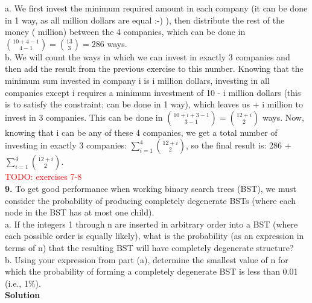 \documentclass[10pt,a4paper,oneside,draft]{report}
\newcommand\myworries[1]{\textcolor{red}{#1}}
\begin{document}
a. We first invest the minimum required amount in each company (it can be done in 1 way, as all million dollars are equal :-) ), then distribute the rest of the money ( million) between the 4 companies, which can be done in ${10 + 4 - 1 \choose 4 - 1} = {13 \choose 3 } = 286 $ ways. \\

b. We will count the ways in which we can invest in exactly 3 companies and then add the result from the previous exercise to this number. Knowing that the minimum sum invested in company i is \textdollar i million dollars, investing in all companies except i requires a minimum investment of 10 - i million dollars (this is to satisfy the constraint; can be done in 1 way), which leaves us  + i million to invest in 3 companies. This can be done in ${10 + i + 3 - 1 \choose 3 - 1} = {12 + i \choose 2}$ ways. Now, knowing that i can be any of these 4 companies, we get a total number of investing in exactly 3 companies: $\sum_{i = 1}^{4} {12 + i \choose 2}$, so the final result is: 286 + $\sum_{i = 1}^{4} {12 + i \choose 2}$. \\

\myworries{TODO: exercises 7-8} \\

\textbf{9.} To get good performance when working binary search trees (BST), we must consider the probability of producing completely degenerate BSTs (where each node in the BST has at most one child). \\
a. If the integers 1 through n are inserted in arbitrary order into a BST (where each possible order is equally likely), what is the probability (as an expression in terms of n) that the resulting BST will have completely degenerate structure? \\
b. Using your expression from part (a), determine the smallest value of n for which the probability of forming a completely degenerate BST is less than 0.01 (i.e., 1\%).\\

\textbf{Solution} \\
\end{document}
